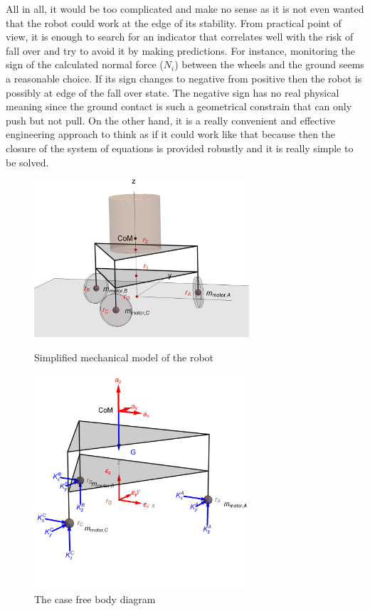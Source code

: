 \documentclass[12pt,english,twoside]{article}
\begin{document}
All in all, it would be too complicated and make no sense as it is not even wanted that the robot could work at the edge of its stability. From practical point of view, it is enough to search for an indicator that correlates well with the risk of fall over and try to avoid it by making predictions. For instance, monitoring the sign of the calculated normal force ($N_i$) between the wheels and the ground seems a reasonable choice. If its sign changes to negative from positive then the robot is possibly at edge of the fall over state. The negative sign has no real physical meaning since the ground contact is such a geometrical constrain that can only push but not pull. On the other hand, it is a really convenient and effective engineering approach to think as if it could work like that because then the closure of the system of equations is provided robustly and it is really simple to be solved.
 \begin{figure}[htb!]
	\centering
	\includegraphics[width=8cm]{figures/robotModel}
	\caption{Simplified mechanical model of the robot}
	\label{robotModel}
	\endminipage\hfill
	\centering
	\includegraphics[width=8cm]{figures/caseFBD}
	\caption{The case free body diagram}
	\label{caseFBD}
	\endminipage\hfill
\end{figure}
\end{document}
